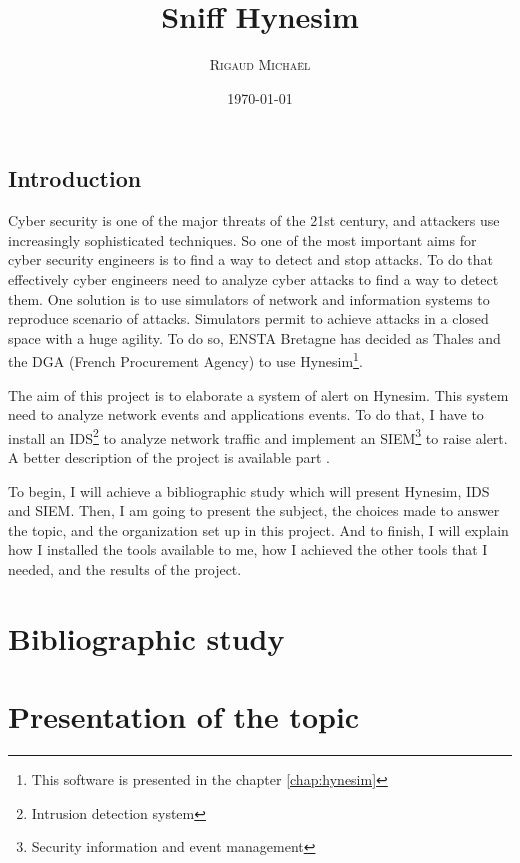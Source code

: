 \documentclass[a4paper, 11pt, oneside, oldfontcommands]{memoir}
\title{Sniff Hynesim}
\author{\textsc{Rigaud Michaël}}
\date{\today}
\newcounter{rem}[chapter]
\newcounter{th}[chapter]
\begin{document}
\maketitle
\thispagestyle{empty}
\newpage

\tableofcontents



\chapter*{Introduction}

Cyber security is one of the major threats of the 21st century, and attackers use increasingly sophisticated
techniques. So one of the most important aims for cyber security engineers is to find a way to detect and stop
attacks. To do that effectively cyber engineers need to analyze cyber attacks to find a way to detect them. One
solution is to use simulators of network and information systems to reproduce scenario of attacks. Simulators
permit to achieve attacks in a closed space with a huge agility. To do so, ENSTA Bretagne has decided as Thales and
the DGA (French Procurement Agency) to use Hynesim\footnote{This software is presented in the chapter
  \ref{chap:hynesim}}.

The aim of this project is to elaborate a system of alert on Hynesim. This system need to analyze network events
and applications events. To do that, I have to install an IDS\footnote{Intrusion detection system} to analyze
network traffic and implement an SIEM\footnote{Security information and event management} to raise alert. A better
description of the project is available part \ref{part:2}.

To begin, I will achieve a bibliographic study which will present Hynesim, IDS and SIEM. Then, I am going to
present the subject, the choices made to answer the topic, and the organization set up in this project. And to
finish, I will explain how I installed the tools available to me, how I achieved the other tools that I needed, and
the results of the project.

\newpage


\part{Bibliographic study}
  
  
  

  \part{Presentation of the topic}
  \label{part:2}
  
  
  
\end{document}
